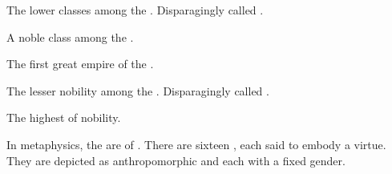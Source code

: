 \begin{gloss}





\begin{subgloss}
  \begin{comment}
  \subparagraph{\bezed}
  \end{comment}
  \gitem[\bezedeth]{\bezed}
  The lower classes among the \resphain. 
  Disparagingly called \quo{\ashenblooded}.
  
  
  
  
  
  \begin{comment}
  \subparagraph{\ketheran}
  \end{comment}
  \gitem[\ketherain]{\ketheran}
  A noble class among the \resphain. 





  \begin{comment}
  \subparagraph{\Merkyrah}
  \end{comment}
  \gitem{\Merkyrah}
  The first great empire of the \resphain. 
  
  
  
  
  
  
  \begin{comment}
  \subparagraph{\thelyad}
  \end{comment}
  \gitem[\thelyadeth]{\thelyad}
  The lesser nobility among the \resphain. 
  Disparagingly called .
  
  
  
  
  
  \begin{comment}
  \subparagraph{\sathariah{} (plural \satharioth)}
  \end{comment}
  \gitem[\satharioth]{\sathariah}
  The highest of \resphan{} nobility. 
\end{subgloss}







\begin{comment}
\paragraph{\sephirah}
\end{comment}
\gitem[\sephiroth]{\sephirah}
In  metaphysics, the \sephiroth{} are  of . 
There are sixteen \sephiroth, each said to embody a virtue. 
They are depicted as anthropomorphic and each with a fixed gender. 


\end{gloss}

